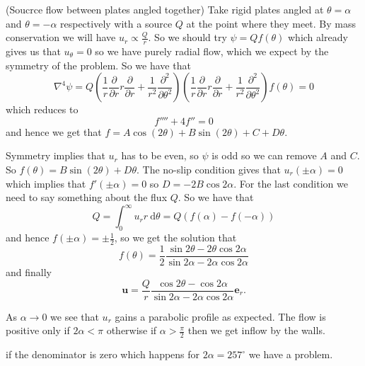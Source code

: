 \documentclass{article}
\begin{document}
\begin{example}
	(Soucrce flow between plates angled together) Take rigid plates angled at $ \theta = \alpha $ and $ \theta = -\alpha $ respectively with a source $ Q $ at the point where they meet. By mass conservation we will have $ u_r \propto \frac Qr $. So we should try $ \psi = Qf(\theta) $ which already gives us that $ u_\theta =0 $ so we have purely radial flow, which we expect by the symmetry of the problem. So we have that
	\[
		\nabla^4 \psi = Q\left(\frac 1r\frac{\partial}{\partial r} r \frac{\partial}{\partial r} + \frac 1{r^2} \frac{\partial^2}{\partial \theta^2}\right)\left(\frac 1r\frac{\partial}{\partial r} r \frac{\partial}{\partial r} + \frac 1{r^2} \frac{\partial^2}{\partial \theta^2}\right)f(\theta)= 0
	\]
	which reduces to
	\[
	  f'''' + 4f'' = 0
	\]
	and hence we get that $ f = A\cos(2\theta) + B\sin(2\theta) + C + D\theta $.\par
	Symmetry implies that $ u_r $ has to be even, so $ \psi $ is odd so we can remove $ A $ and $ C $. So $ f(\theta) = B\sin(2\theta) + D\theta $. The no-slip condition gives that $ u_r(\pm \alpha) = 0  $ which implies that $ f'(\pm \alpha) = 0 $ so $ D = - 2B\cos 2\alpha $. For the last condition we need to say something about the flux $ Q $. So we have that
	\[
		Q = \int_0^{\infty} u_r r \ \mathrm d\theta = Q(f(\alpha)- f(-\alpha))
	\]
	and hence $ f(\pm \alpha) = \pm \frac 12 $, so we get the solution that
	\[
		f(\theta) =  \frac 12 \frac{\sin2\theta - 2\theta \cos 2\alpha}{\sin2\alpha - 2\alpha\cos2\alpha}
	\]
	and finally
	\[
		\mathbf u = \frac Q{r} \frac{\cos2\theta - \cos2\alpha}{\sin2\alpha - 2\alpha \cos2\alpha}\mathbf e_r.
	\]
	\begin{remark}
	  As $ \alpha \to 0 $ we see that $ u_r $ gains a parabolic profile as expected. The flow is positive only if $ 2\alpha < \pi $ otherwise if $ \alpha > \frac \pi 2 $ then we get inflow by the walls.
	\end{remark}
	\begin{remark}
	  if the denominator is zero which happens for $ 2\alpha = 257^\circ $ we have a problem.
  \end{remark}
\end{example}
\end{document}
